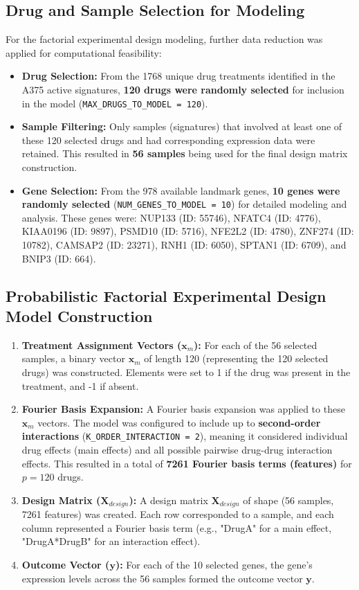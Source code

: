 \documentclass[12pt]{article}
\begin{document}
\subsection{Drug and Sample Selection for Modeling}

For the factorial experimental design modeling, further data reduction was applied for computational feasibility:
\begin{itemize}
    \item \textbf{Drug Selection:} From the 1768 unique drug treatments identified in the A375 active signatures, \textbf{120 drugs were randomly selected} for inclusion in the model (\texttt{MAX\_DRUGS\_TO\_MODEL = 120}).
    \item \textbf{Sample Filtering:} Only samples (signatures) that involved at least one of these 120 selected drugs and had corresponding expression data were retained. This resulted in \textbf{56 samples} being used for the final design matrix construction.
    \item \textbf{Gene Selection:} From the 978 available landmark genes, \textbf{10 genes were randomly selected} (\texttt{NUM\_GENES\_TO\_MODEL = 10}) for detailed modeling and analysis. These genes were: NUP133 (ID: 55746), NFATC4 (ID: 4776), KIAA0196 (ID: 9897), PSMD10 (ID: 5716), NFE2L2 (ID: 4780), ZNF274 (ID: 10782), CAMSAP2 (ID: 23271), RNH1 (ID: 6050), SPTAN1 (ID: 6709), and BNIP3 (ID: 664).
\end{itemize}

\subsection{Probabilistic Factorial Experimental Design Model Construction}

\begin{enumerate}
    \item \textbf{Treatment Assignment Vectors ($\mathbf{x}_m$):} For each of the 56 selected samples, a binary vector $\mathbf{x}_m$ of length 120 (representing the 120 selected drugs) was constructed. Elements were set to 1 if the drug was present in the treatment, and -1 if absent.
    \item \textbf{Fourier Basis Expansion:} A Fourier basis expansion was applied to these $\mathbf{x}_m$ vectors. The model was configured to include up to \textbf{second-order interactions} (\texttt{K\_ORDER\_INTERACTION = 2}), meaning it considered individual drug effects (main effects) and all possible pairwise drug-drug interaction effects. This resulted in a total of \textbf{7261 Fourier basis terms (features)} for $p=120$ drugs.
    \item \textbf{Design Matrix ($\mathbf{X}_{design}$):} A design matrix $\mathbf{X}_{design}$ of shape (56 samples, 7261 features) was created. Each row corresponded to a sample, and each column represented a Fourier basis term (e.g., "DrugA" for a main effect, "DrugA*DrugB" for an interaction effect).
    \item \textbf{Outcome Vector ($\mathbf{y}$):} For each of the 10 selected genes, the gene's expression levels across the 56 samples formed the outcome vector $\mathbf{y}$.
\end{enumerate}
\end{document}
